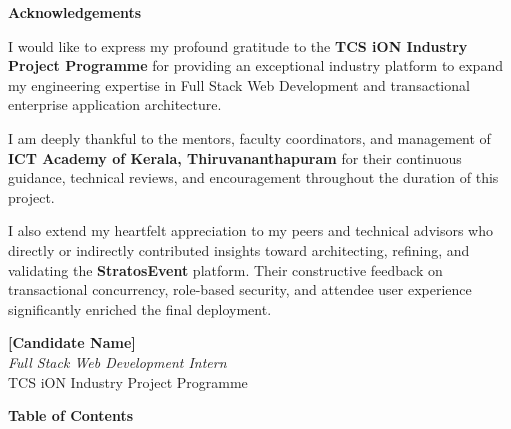 \documentclass[11pt,a4paper]{article}
\begin{document}
\endgroup


\newpage
\thispagestyle{fancy}

\vspace*{0.2in}

{\color{TitleBlue}\bfseries
 \fontsize{18}{22}\selectfont
 Acknowledgements\par}

\vspace{0.2in}

\noindent
I would like to express my profound gratitude to the \textbf{TCS iON Industry Project Programme} for providing an exceptional industry platform to expand my engineering expertise in Full Stack Web Development and transactional enterprise application architecture.

\vspace{0.12in}
\noindent
I am deeply thankful to the mentors, faculty coordinators, and management of \textbf{ICT Academy of Kerala, Thiruvananthapuram} for their continuous guidance, technical reviews, and encouragement throughout the duration of this project.

\vspace{0.12in}
\noindent
I also extend my heartfelt appreciation to my peers and technical advisors who directly or indirectly contributed insights toward architecting, refining, and validating the \textbf{StratosEvent} platform. Their constructive feedback on transactional concurrency, role-based security, and attendee user experience significantly enriched the final deployment.

\vspace{0.45in}
\begin{flushright}
  \textbf{[Candidate Name]}\\
  \textit{Full Stack Web Development Intern}\\
  TCS iON Industry Project Programme
\end{flushright}


\newpage
\thispagestyle{fancy}

\vspace*{0.2in}

{\color{TitleBlue}\bfseries
 \fontsize{18}{22}\selectfont
 Table of Contents\par}
\end{document}
